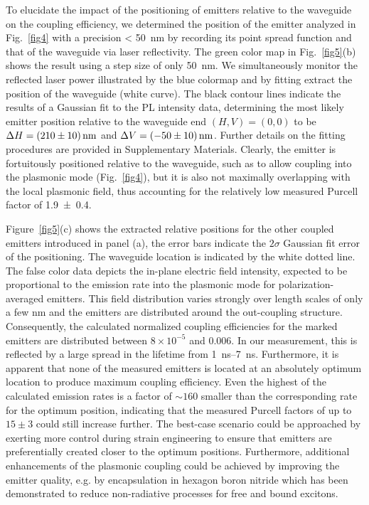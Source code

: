 \documentclass[journal=nalefd,manuscript=letter]{achemso}
\begin{document}
To elucidate the impact of the positioning of emitters relative to the waveguide on the coupling efficiency, we determined the position of the emitter analyzed in Fig.~\ref{fig4} with a precision \SI{< 50}{\nano\meter} by recording its point spread function and that of the waveguide via laser reflectivity.
The green color map in Fig.~\ref{fig5}(b) shows the result using a step size of only \SI{50}{\nano\meter}.
We simultaneously monitor the reflected laser power illustrated by the blue colormap and by fitting extract the position of the waveguide (white curve).
The black contour lines indicate the results of a Gaussian fit to the PL intensity data, determining the most likely emitter position relative to the waveguide end $(H, V) = (0,0)$ to be $\Delta H = \SI{210 \pm 10}{\nano\meter}$ and $\Delta V = \SI{-50 \pm 10}{\nano\meter}$.
Further details on the fitting procedures are provided in Supplementary Materials.
Clearly, the emitter is fortuitously positioned relative to the waveguide, such as to allow coupling into the plasmonic mode (Fig.~\ref{fig4}), but it is also not maximally overlapping with the local plasmonic field, thus accounting for the relatively low measured Purcell factor of \SI{1.9 \pm 0.4}{}.

Figure~\ref{fig5}(c) shows the extracted relative positions for the other coupled emitters introduced in panel (a), the error bars indicate the $2\sigma$ Gaussian fit error of the positioning. The waveguide location is indicated by the white dotted line.
The false color data depicts the in-plane electric field intensity, expected to be proportional to the emission rate into the plasmonic mode for polarization-averaged emitters.
This field distribution varies strongly over length scales of only a few nm and the emitters are distributed around the out-coupling structure.
Consequently, the calculated normalized coupling efficiencies for the marked emitters are distributed between $8 \times 10^{-5}$ and $0.006$.
In our measurement, this is reflected by a large spread in the lifetime from \SIrange{1}{7}{\nano\second}.
Furthermore, it is apparent that none of the measured emitters is located at an absolutely optimum location to produce maximum coupling efficiency.
Even the highest of the calculated emission rates is a factor of $\sim 160$ smaller than the corresponding rate for the optimum position, indicating that the measured Purcell factors of up to $15 \pm 3$ could still increase further.
The best-case scenario could be approached by exerting more control during strain engineering to ensure that emitters are preferentially created closer to the optimum positions.
Furthermore, additional enhancements of the plasmonic coupling could be achieved by improving the emitter quality, e.g. by encapsulation in hexagon boron nitride which has been demonstrated to reduce non-radiative processes for free\cite{ajayi.2017,cadiz.2017,wierzbowski.2017} and bound excitons\cite{Tonndorf.2015}.
\end{document}
